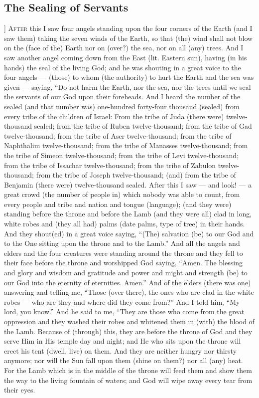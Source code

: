 \begin{pages}
\begin{Leftside}
        			\chapter{The Sealing of Servants}
				]
		\renewcommand{\LettrineFontHook}{\Zallmanfamily}
		\lettrine[lines=3]{A}{fter} this I saw four angels standing upon the four corners of the Earth (and I saw them) taking the seven winds of the Earth, so that (the) wind shall not blow on the (face of the) Earth nor on (over?) the sea, nor on all (any) trees.
		\pend
		\pstart
		And I saw another angel coming down from the East (lit. Eastern sun), having (in his hands) the seal of the living God; and he was shouting in a great voice to the four angels — (those) to whom (the authority) to hurt the Earth and the sea was given — saying, “Do not harm the Earth, nor the sea, nor the trees until we seal the servants of our God upon their foreheads. And I heard the number of the sealed (and that number was) one-hundred forty-four thousand (sealed) from every tribe of the children of Israel:
		\pend
		\pstart
		From the tribe of Juda (there were) twelve-thousand sealed; from the tribe of Ruben twelve-thousand; from the tribe of Gad twelve-thousand; from the tribe of Aser twelve-thousand; from the tribe of Naphthalim twelve-thousand; from the tribe of Manasses twelve-thousand; from the tribe of Simeon twelve-thousand; from the tribe of Levi twelve-thousand; from the tribe of Issachar twelve-thousand; from the tribe of Zabulon twelve-thousand; from the tribe of Joseph twelve-thousand; (and) from the tribe of Benjamin (there were) twelve-thousand sealed.
		\pend
		\pstart
		After this I saw — and look! — a great crowd (the number of people in) which nobody was able to count, from every people and tribe and nation and tongue (language); (and they were) standing before the throne and before the Lamb (and they were all) clad in long, white robes and (they all had) palms (date palms, type of tree) in their hands. And they shout(ed) in a great voice saying, “(The) salvation (be) to our God and to the One sitting upon the throne and to the Lamb.”
		\pend
		\pstart
		And all the angels and elders and the four creatures were standing around the throne and they fell to their face before the throne and worshipped God saying, “Amen. The blessing and glory and wisdom and gratitude and power and might and strength (be) to our God into the eternity of eternities. Amen.”
		\pend
		\pstart
		And of the elders (there was one) answering and telling me, “Those (over there), the ones who are clad in the white robes — who are they and where did they come from?” And I told him, “My lord, you know.” And he said to me, “They are those who come from the great oppression and they washed their robes and whitened them in (with) the blood of the Lamb. Because of (through) this, they are before the throne of God and they serve Him in His temple day and night; and He who sits upon the throne will erect his tent (dwell, live) on them. And they are neither hungry nor thirsty anymore; nor will the Sun fall upon them (shine on them?) nor all (any) heat. For the Lamb which is in the middle of the throne will feed them and show them the way to the living fountain of waters; and God will wipe away every tear from their eyes. 

\end{Leftside}
\end{pages}
